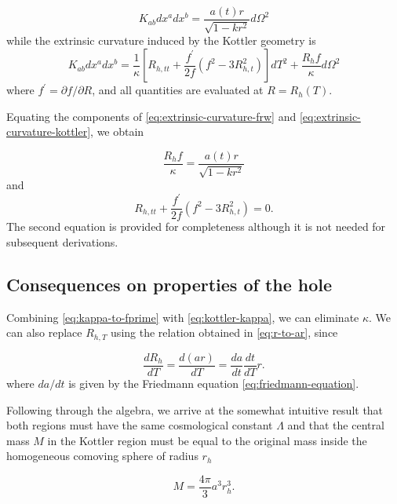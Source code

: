 \begin{equation}
  K_{ab} dx^a dx^b = \frac{a(t)r}{\sqrt{1-kr^2}} d \Omega^2
  \label{eq:extrinsic-curvature-frw}
\end{equation}
while the extrinsic curvature induced by the Kottler geometry is
\begin{equation}
  K_{ab} dx^a dx^b = \frac{1}{\kappa} \left [ R_{h,tt} + \frac{f^{\prime}}{2f}(f^2 - 3R_{h,t}^2) \right ] dT^2 + \frac{R_h f}{\kappa} d \Omega^2
  \label{eq:extrinsic-curvature-kottler}
\end{equation}
where $f^{\prime} = \partial f / \partial R$, and all quantities are evaluated at $R = R_h(T)$.

Equating the components of \autoref{eq:extrinsic-curvature-frw} and \autoref{eq:extrinsic-curvature-kottler}, we obtain

\begin{equation}
  \frac{R_h f}{\kappa} = \frac{a(t)r}{\sqrt{1-kr^2}}
  \label{eq:kappa-to-fprime}
\end{equation}
and
\begin{equation}
  R_{h,tt} + \frac{f^{\prime}}{2f}(f^2 - 3R_{h,t}^2) = 0.
\end{equation}
The second equation is provided for completeness although it is not needed for subsequent derivations. 

\subsection{Consequences on properties of the hole}

Combining \autoref{eq:kappa-to-fprime} with \autoref{eq:kottler-kappa}, we can eliminate $\kappa$. We can also replace $R_{h,T}$ using the relation obtained in \autoref{eq:r-to-ar}, since

\begin{equation}
  \frac{dR_h}{dT} = \frac{d(ar)}{dT} = \frac{da}{dt}\frac{dt}{dT}r.
\end{equation}
where $da/dt$ is given by the Friedmann equation \ref{eq:friedmann-equation}. 

Following through the algebra, we arrive at the somewhat intuitive result that both regions must have the same cosmological constant $\Lambda$ and that the central mass $M$ in the Kottler region must be equal to the original mass inside the homogeneous comoving sphere of radius $r_h$

\begin{equation}
  M = \frac{4\pi}{3} a^3 r_h^3. 
  \label{eq:junction-conditions-mass-volume}
\end{equation}

